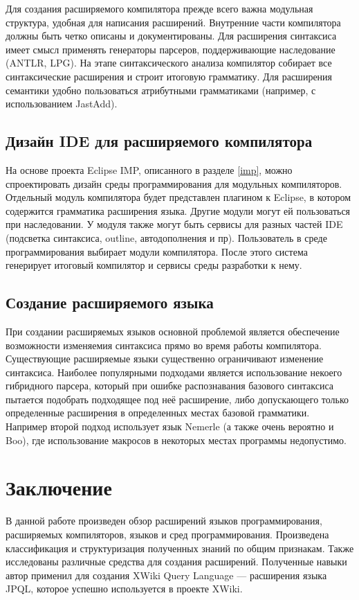 \documentclass[a4paper,12pt,titlepage]{extarticle}
\begin{document}
Для создания расширяемого компилятора прежде всего важна модульная структура,
удобная для написания расширений. Внутренние части компилятора должны быть
четко описаны и документированы.
Для расширения синтаксиса имеет смысл применять генераторы парсеров,
поддерживающие наследование (ANTLR, LPG).
На этапе синтаксического анализа компилятор собирает все синтаксические
расширения и строит итоговую грамматику.
Для расширения семантики удобно пользоваться атрибутными грамматиками
(например, с использованием JastAdd).

\subsection{Дизайн IDE для расширяемого компилятора}

На основе проекта Eclipse IMP, описанного в разделе \ref{imp}, можно
спроектировать дизайн среды программирования для модульных компиляторов.
Отдельный модуль компилятора будет представлен плагином к Eclipse, в котором
содержится грамматика расширения языка. Другие модули могут ей
пользоваться при наследовании. У модуля также могут быть сервисы для разных
частей IDE (подсветка синтаксиса, outline, автодополнения и пр).
Пользователь в среде программирования выбирает модули компилятора. После этого
система генерирует итоговый компилятор и сервисы среды разработки к нему.

\subsection{Создание расширяемого языка}

При создании расширяемых языков основной проблемой является
обеспечение возможности изменяемия синтаксиса прямо во время работы
компилятора.
Существующие расширяемые языки существенно ограничивают изменение синтаксиса.
Наиболее популярными подходами является использование некоего
гибридного парсера, который при ошибке распознавания базового синтаксиса
пытается подобрать подходящее под неё расширение, либо допускающего только
определенные расширения в определенных местах базовой грамматики. Например
второй подход использует язык Nemerle (а также очень вероятно и Boo), где
использование макросов в некоторых местах программы недопустимо.

\section{Заключение}

В данной работе произведен обзор расширений языков программирования,
расширяемых компиляторов, языков и сред программирования. Произведена
классификация и структуризация полученных знаний по общим признакам.  Также
исследованы различные средства для создания расширений.
Полученные навыки автор применил для создания XWiki Query
Language\cite{xwql} --- расширения языка JPQL, которое успешно используется в
проекте XWiki.
 
\small



\end{document}

